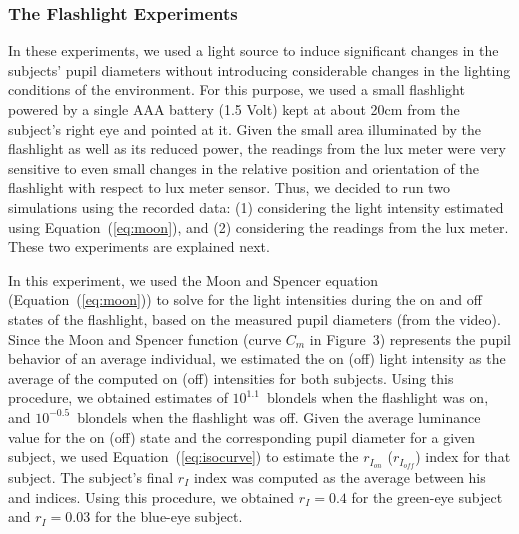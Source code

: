 \documentclass{acmtog} %
\begin{document}
\subsubsection{The Flashlight Experiments}
\label{sec:first_flashlightExperiment}

In these experiments, we used a light source to induce significant
changes in the subjects' pupil diameters without introducing
considerable changes in the lighting conditions of the environment. For
this purpose, we used a small flashlight powered by a single AAA battery
(1.5 Volt) kept at about 20cm from the subject's right eye and pointed
at it. Given the small area illuminated by the flashlight as well as its
reduced power, the readings from the lux meter were very sensitive to
even small changes in the relative position and orientation of the
flashlight with respect to lux meter sensor. Thus, we decided to run two
simulations using the recorded data: (1) considering the light intensity
estimated using Equation~(\ref{eq:moon}), and (2) considering the
readings from the lux meter. These two experiments are explained next.

In this experiment, we used the Moon and Spencer equation
(Equation~(\ref{eq:moon})) to solve for the light intensities during the
{on} and {off} states of the flashlight, based on the measured pupil
diameters (from the video). Since the Moon and Spencer function (curve
$C_m$ in Figure~3) represents the pupil behavior of an average
individual, we estimated the {on} ({off}) light intensity as the average
of the computed {on} ({off}) intensities for both subjects. Using this
procedure, we obtained estimates of $10^{1.1}$~blondels when the
flashlight was on, and $10^{-0.5}$~blondels when the flashlight was off.
Given the average luminance value for the {on} ({off}) state and the
{corresponding} pupil diameter for a given subject, we used
Equation~(\ref{eq:isocurve}) to estimate the $r_{I_{on}}$
($r_{I_{off}}$) index for that subject. The subject's final $r_I$ index
was computed as the average between his  and
 indices. Using this procedure, we obtained $r_I =
0.4$ for the green-eye subject and $r_I = 0.03$ for the blue-eye
subject.
\end{document}
